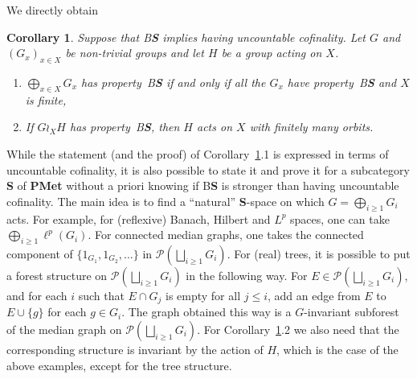 \documentclass[a4paper]{article}
\newcounter{mycomment}
\newcommand{\mycomment}[2][]{\refstepcounter{mycomment}{\todo[color={green!33},size=\small]{\textbf{Commentaire [\uppercase{#1}\themycomment]:}~#2}}}
\newcommand{\PH}[1]{\todo[color={blue!33},size=small]{\textbf{PH :} #1}}
\newcommand{\GS}[1]{\mycomment[GS]{#1}}
\newtheorem{cor}[lem]{Corollary}
\theoremstyle{definition}
\newcommand*{\category}[1]{\textbf{#1}}
\newcommand*{\PMet}{\category{PMet}}
\newcommand*{\CatS}{\category{S}}
\newcommand*{\BS}{B\textbf{S}}
\newcommand*{\powerset}[1]{\mathcal P(#1)}
\begin{document}
%
%
We directly obtain
%
%
\begin{cor}\label{Cor:Cof}
Suppose that \BS{} implies having uncountable cofinality.
Let $G$ and $(G_x)_{x\in X}$ be non-trivial groups and let $H$ be a group acting on $X$. %
\begin{enumerate}
\item $\bigoplus_{x\in X}G_x$ has property~\BS{} if and only if all the $G_x$ have property~\BS{} and $X$ is finite,
\item If $G\wr_XH$ has property~\BS, then $H$ acts on $X$ with finitely many orbits.
\end{enumerate}
\end{cor}

While the statement (and the proof) of Corollary~\ref{Cor:Cof}.1 is expressed in terms of uncountable cofinality, it is also possible to state it and prove it for a subcategory \CatS{} of \PMet{} without a priori knowing if \BS{} is stronger than having uncountable cofinality.
The main idea is to find a ``natural'' \CatS-space on which $G=\bigoplus_{i\geq 1}G_i$ acts. For example, for (reflexive) Banach, Hilbert and $L^p$ spaces, one can take $\bigoplus_{i\geq 1}\ell^p(G_i)$. For connected median graphs, one takes the connected component of $\{1_{G_1},1_{G_2},\dots\}$ in $\powerset{\bigsqcup_{i\geq 1} G_i}$.
For (real) trees, it is possible to put a forest structure on $\powerset{\bigsqcup_{i\geq 1} G_i}$ in the following way.
For $E\in\powerset{\bigsqcup_{i\geq 1} G_i}$, and for each $i$ such that $E\cap G_j$ is empty for all $j\leq i$, add an edge from $E$ to $E\cup\{g\}$ for each $g\in G_i$. The graph obtained this way is a $G$-invariant subforest of the median graph on $\powerset{\bigsqcup_{i\geq 1} G_i}$.
For Corollary~\ref{Cor:Cof}.2 we also need that the corresponding structure is invariant by the action of $H$, which is the case of the above examples, except for the tree structure.
\end{document}
